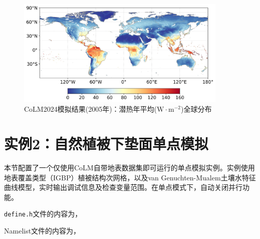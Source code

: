 \begin{figure}[htpb]
    \centering
    \includegraphics[width=0.90\textwidth]{figures/Example01_Qle_Global_Grid_50km_PC_VG.jpg}
    \caption{CoLM2024模拟结果(2005年)：潜热年平均($\mathrm{W \cdot m^{-2}}$)全球分布}
    \label{fig:fig_example01_qle}
\end{figure}

\section{实例2：自然植被下垫面单点模拟}

本节配置了一个仅使用CoLM自带地表数据集即可运行的单点模拟实例。实例使用地表覆盖类型（IGBP）植被结构次网格，以及van Genuchten-Mualem土壤水特征曲线模型，实时输出调试信息及检查变量范围。在单点模式下，自动关闭并行功能。

\texttt{define.h}文件的内容为，


Namelist文件的内容为，


